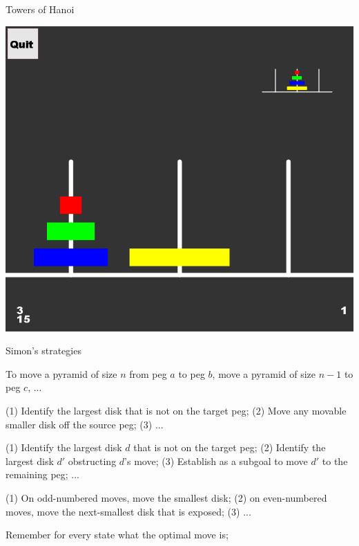 \documentclass[xcolor=table]{beamer}
\begin{document}
\begin{frame}{Towers of Hanoi}
\centerline{
 \includegraphics[height=.9\textheight]{towersofhanoi.png}}
\end{frame}

\begin{frame}{Simon's strategies}
  \begin{description}[<+->]
  \item[Goal-recursion:] To move a pyramid of size $n$ from peg $a$ to peg $b$, move a pyramid of size $n-1$ to peg $c$, ...
  \item[Perceptual] (1) Identify the largest disk that is not on the target peg; (2) Move any movable smaller disk off the source peg; (3) ...
  \item[Sophisticated Perceptual] (1) Identify the largest disk $d$ that is not on the target peg; (2) Identify the largest disk $d'$ obstructing $d$'s move; (3) Establish as a subgoal to move $d'$ to the remaining peg; ...
  \item[Move-pattern:] (1) On odd-numbered moves, move the smallest disk; (2) on even-numbered moves, move the next-smallest disk that is exposed; (3) ...
  \item[Rote learning:] Remember for every state what the optimal move is;
  \end{description}
\end{frame}
\end{document}

